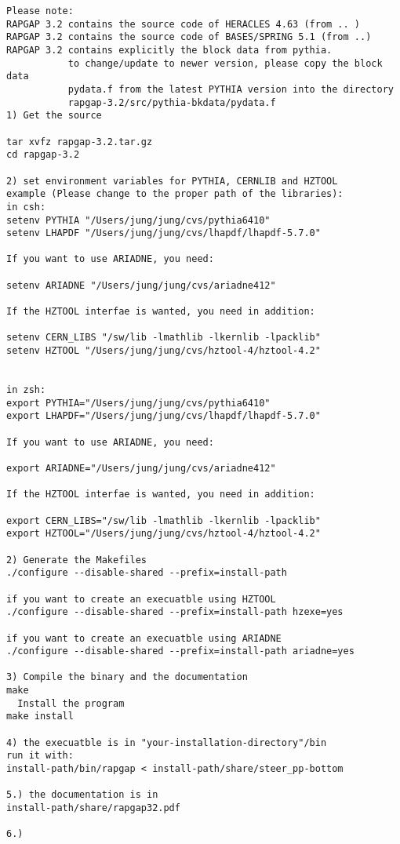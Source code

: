 \documentclass[10pt]{article} \usepackage{dina4}
\begin{document}
\begin{verbatim}
Please note:
RAPGAP 3.2 contains the source code of HERACLES 4.63 (from .. )
RAPGAP 3.2 contains the source code of BASES/SPRING 5.1 (from ..)
RAPGAP 3.2 contains explicitly the block data from pythia.
           to change/update to newer version, please copy the block data
           pydata.f from the latest PYTHIA version into the directory
           rapgap-3.2/src/pythia-bkdata/pydata.f
1) Get the source

tar xvfz rapgap-3.2.tar.gz
cd rapgap-3.2

2) set environment variables for PYTHIA, CERNLIB and HZTOOL
example (Please change to the proper path of the libraries):
in csh: 
setenv PYTHIA "/Users/jung/jung/cvs/pythia6410"
setenv LHAPDF "/Users/jung/jung/cvs/lhapdf/lhapdf-5.7.0"

If you want to use ARIADNE, you need:

setenv ARIADNE "/Users/jung/jung/cvs/ariadne412"

If the HZTOOL interfae is wanted, you need in addition:

setenv CERN_LIBS "/sw/lib -lmathlib -lkernlib -lpacklib"
setenv HZTOOL "/Users/jung/jung/cvs/hztool-4/hztool-4.2"


in zsh:
export PYTHIA="/Users/jung/jung/cvs/pythia6410"
export LHAPDF="/Users/jung/jung/cvs/lhapdf/lhapdf-5.7.0"

If you want to use ARIADNE, you need:

export ARIADNE="/Users/jung/jung/cvs/ariadne412"

If the HZTOOL interfae is wanted, you need in addition:

export CERN_LIBS="/sw/lib -lmathlib -lkernlib -lpacklib"
export HZTOOL="/Users/jung/jung/cvs/hztool-4/hztool-4.2"

2) Generate the Makefiles
./configure --disable-shared --prefix=install-path

if you want to create an execuatble using HZTOOL 
./configure --disable-shared --prefix=install-path hzexe=yes

if you want to create an execuatble using ARIADNE
./configure --disable-shared --prefix=install-path ariadne=yes

3) Compile the binary and the documentation
make
  Install the program
make install

4) the execuatble is in "your-installation-directory"/bin
run it with:
install-path/bin/rapgap < install-path/share/steer_pp-bottom

5.) the documentation is in
install-path/share/rapgap32.pdf

6.) 
\end{verbatim}
\end{document}
